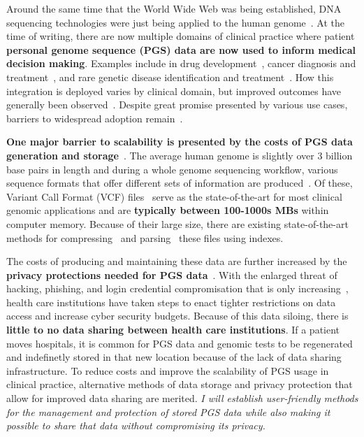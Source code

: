 \documentclass[a4paper,11pt]{article}
\begin{document}
\begin{refsection}
Around the same time that the World Wide Web was being established, DNA sequencing technologies were just being applied to the human genome~\cite{hood_1987}.
At the time of writing, there are now multiple domains of clinical practice where patient \textbf{personal genome sequence (PGS) data are now used to inform medical decision making}. 
Examples include in drug development~\cite{ko_new_2022}, cancer diagnosis and treatment~\cite{mcleod_cancer_2013}, and rare genetic disease identification and treatment~\cite{souche_recommendations_2022}.
How this integration is deployed varies by clinical domain, but improved outcomes have generally been observed~\cite{mathur_personalized_2017}.
Despite great promise presented by various use cases, barriers to widespread adoption remain~\cite{stefanicka-wojtas_barriers_2023}.

\textbf{One major barrier to scalability is presented by the costs of PGS data generation and storage}~\cite{genomics_cost_2023}.
The average human genome is slightly over 3 billion base pairs in length and during a whole genome sequencing workflow, various sequence formats that offer different sets of information are produced~\cite{bagger_whole_2024}.
Of these, Variant Call Format (VCF) files~\cite{danecek_variant_2011} serve as the state-of-the-art for most clinical genomic applications and are \textbf{typically between 100-1000s MBs} within computer memory. 
Because of their large size, there are existing state-of-the-art methods for compressing~\cite{vcf_compression_2022} and parsing~\cite{yang_seqminer2_2020} these files using indexes.

The costs of producing and maintaining these data are further increased by the \textbf{privacy protections needed for PGS data}~\cite{GDPR_2016}.
With the enlarged threat of hacking, phishing, and login credential compromisation that is only increasing~\cite{ransomware}, health care institutions have taken steps to enact tighter restrictions on data access and increase cyber security budgets.
Because of this data siloing, there is \textbf{little to no data sharing between health care institutions}. 
If a patient moves hospitals, it is common for PGS data and genomic tests to be regenerated and indefinetly stored in that new location because of the lack of data sharing infrastructure.
To reduce costs and improve the scalability of PGS usage in clinical practice, alternative methods of data storage and privacy protection that allow for improved data sharing are merited.
\emph{I will establish user-friendly methods for the management and protection of stored PGS data while also making it possible to share that data without compromising its privacy.}



\end{refsection}
\end{document}
